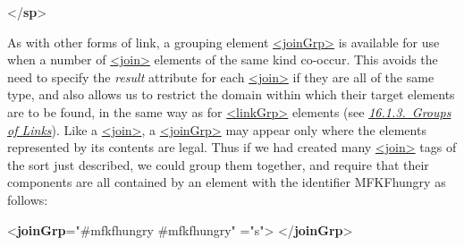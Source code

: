 \begin{shaded}
\mbox{}\newline 
{}\mbox{}\newline 
{</\textbf{sp}>}\end{shaded}\egroup\par \par
As with other forms of link, a grouping element \hyperref[TEI.joinGrp]{<joinGrp>} is available for use when a number of \hyperref[TEI.join]{<join>} elements of the same kind co-occur. This avoids the need to specify the {\itshape result} attribute for each \hyperref[TEI.join]{<join>} if they are all of the same type, and also allows us to restrict the domain within which their target elements are to be found, in the same way as for \hyperref[TEI.linkGrp]{<linkGrp>} elements (see \textit{\hyperref[SAPTLG]{16.1.3.\ Groups of Links}}). Like a \hyperref[TEI.join]{<join>}, a \hyperref[TEI.joinGrp]{<joinGrp>} may appear only where the elements represented by its contents are legal. Thus if we had created many \hyperref[TEI.join]{<join>} tags of the sort just described, we could group them together, and require that their components are all contained by an element with the identifier MFKFhungry as follows: \par\bgroup{}\exampleFont \begin{shaded}\noindent\mbox{}{<\textbf{joinGrp}\hspace*{1em}{domains}="{\#mfkfhungry \#mfkfhungry}"\mbox{}\newline 
\hspace*{1em}{result}="{s}">}\mbox{}\newline 
{}\mbox{}\newline 
{}\mbox{}\newline 
{</\textbf{joinGrp}>}\end{shaded}\egroup\par \par
